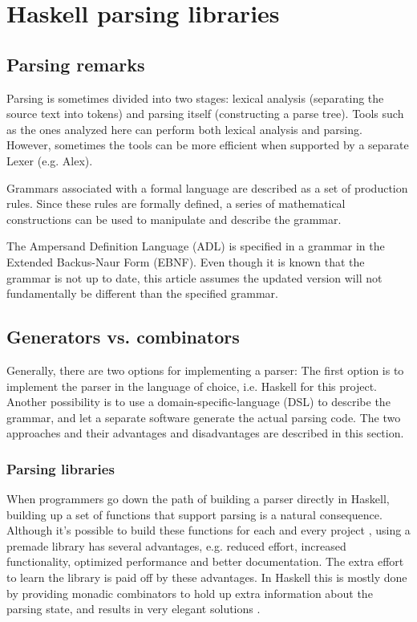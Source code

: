 
\section{Haskell parsing libraries}
\label{sec:libraries}

\subsection{Parsing remarks}
%
%
%
Parsing is sometimes divided into two stages: lexical analysis (separating the source text into tokens) and parsing itself (constructing a parse tree).
Tools such as the ones analyzed here can perform both lexical analysis and parsing.
However, sometimes the tools can be more efficient when supported by a separate Lexer (e.g. Alex).

Grammars associated with a formal language are described as a set of production rules.
Since these rules are formally defined, a series of mathematical constructions can be used to manipulate and describe the grammar.

%
%
%
The Ampersand Definition Language (ADL) is specified in a grammar in the Extended Backus-Naur Form (EBNF).
Even though it is known that the grammar is not up to date, this article assumes the updated version will not fundamentally be different than the specified grammar.

\subsection{Generators vs. combinators}
%
Generally, there are two options for implementing a parser:
The first option is to implement the parser in the language of choice, i.e. Haskell for this project.
Another possibility is to use a domain-specific-language (DSL) to describe the grammar, and let a separate software generate the actual parsing code.
The two approaches and their advantages and disadvantages are described in this section.

\subsubsection{Parsing libraries}
When programmers go down the path of building a parser directly in Haskell, building up a set of functions that support parsing is a natural consequence.
Although it's possible to build these functions for each and every project \cite{monadic-parsing}, using a premade library has several advantages, e.g. reduced effort, increased functionality, optimized performance and better documentation.
The extra effort to learn the library is paid off by these advantages.
In Haskell this is mostly done by providing monadic combinators to hold up extra information about the parsing state, and results in very elegant solutions \cite{monadic-parsing}.

